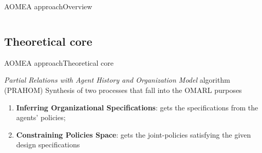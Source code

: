 \begin{frame}{AOMEA approach}{Overview}
\begin{columns}
    \end{columns}

\end{frame}


\subsection{Theoretical core}

\begin{frame}[allowframebreaks]{AOMEA approach}{Theoretical core}

    \begin{block}{\emph{Partial Relations with Agent History and Organization Model} algorithm (PRAHOM)}
        Synthesis of two processes that fall into the OMARL purposes
        \begin{enumerate}
            \item \textbf{Inferring Organizational Specifications}: gets the specifications from the agents' policies;
            \item \textbf{Constraining Policies Space}: gets the joint-policies satisfying the given design specifications
        \end{enumerate}
    \end{block}
\end{frame}

